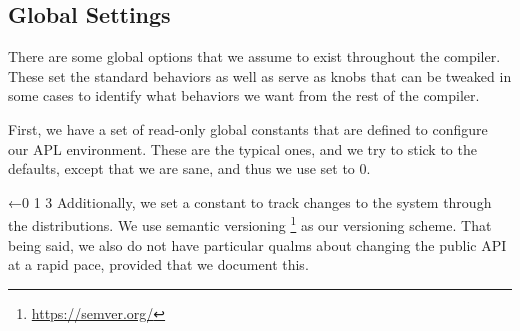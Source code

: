 \documentclass{article}%
\begin{document}
\nwenddocs{}\subsection{Global Settings}

There are some global options that we assume to exist throughout
the compiler.
These set the standard behaviors as well as serve as knobs that 
can be tweaked in some cases to identify what behaviors we want 
from the rest of the compiler.

First, we have a set of read-only global constants that are defined
to configure our APL environment.
These are the typical ones, and we try to stick to the defaults,
except that we are sane, and thus we use {\Tt{}\nwendquote} set to {\Tt{}0\nwendquote}.

\nwenddocs{}\endmoddef\nwstartdeflinemarkup{}\nwenddeflinemarkup
{}  ←0 1 3
\eatline
{}\nwendcode{}\nwdocspar
\noindent
Additionally, we set a {\Tt{}\nwendquote} constant to track changes to the 
system through the distributions.
We use semantic versioning%
\footnote{\href{https://semver.org/}{https://semver.org/}}
as our versioning scheme.
That being said, we also do not have particular qualms about changing
the public API at a rapid pace, provided that we document this.
\end{document}
